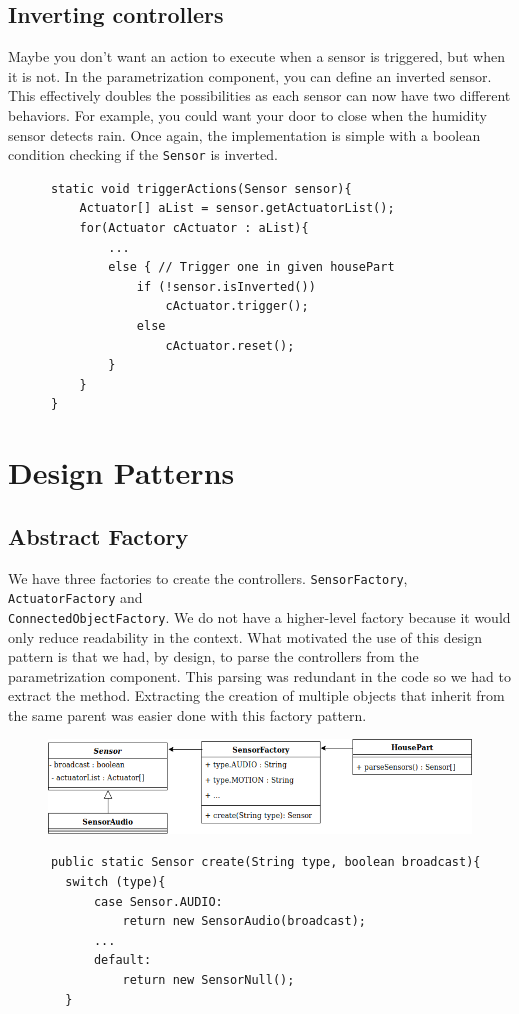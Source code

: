     \subsection{Inverting controllers}
      Maybe you don't want an action to execute when a sensor is triggered, but when it is not. In the parametrization component, you can define an inverted sensor. This effectively doubles the possibilities as each sensor can now have two different behaviors. For example, you could want your door to close when the humidity sensor detects rain. Once again, the implementation is simple with a boolean condition checking if the \texttt{Sensor} is inverted.
      \begin{verbatim}
      static void triggerActions(Sensor sensor){
          Actuator[] aList = sensor.getActuatorList();
          for(Actuator cActuator : aList){
              ...
              else { // Trigger one in given housePart
                  if (!sensor.isInverted())
                      cActuator.trigger();
                  else
                      cActuator.reset();
              }
          }
      }
      \end{verbatim}

  \section{Design Patterns}
    \subsection{Abstract Factory}
      We have three factories to create the controllers. \texttt{SensorFactory}, \texttt{ActuatorFactory} and \\ \texttt{ConnectedObjectFactory}. We do not have a higher-level factory because it would only reduce readability in the context. What motivated the use of this design pattern is that we had, by design, to parse the controllers from the parametrization component. This parsing was redundant in the code so we had to extract the method. Extracting the creation of multiple objects that inherit from the same parent was easier done with this factory pattern.
      \begin{figure}[!h]
        \includegraphics[width=\textwidth]{sensorfactory.png}
      \end{figure}
      \begin{verbatim}
      public static Sensor create(String type, boolean broadcast){
        switch (type){
            case Sensor.AUDIO:
                return new SensorAudio(broadcast);
            ...
            default:
                return new SensorNull();
        }
      \end{verbatim}

